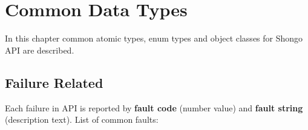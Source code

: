 \chapter{Common Data Types}



In this chapter common atomic types, enum types and object classes for Shongo API are described.

\section{Failure Related}

Each failure in API is reported by \textbf{fault code} (number value) and \textbf{fault string} (description text). List of common faults:

\newcommand{\fault}[3]{#1 & #2 & #3 \\ \hline}
